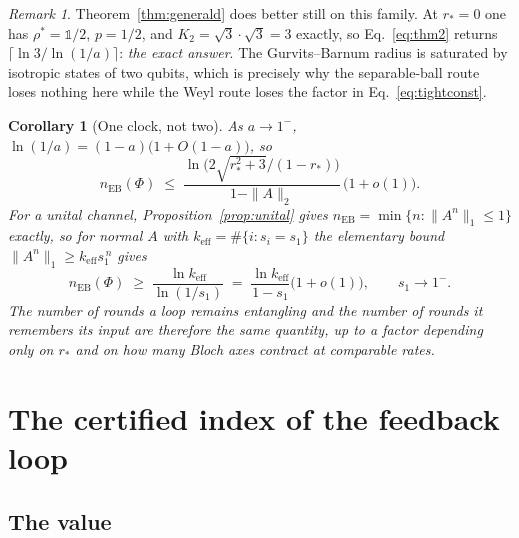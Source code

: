 \documentclass[11pt,a4paper]{article}
\newtheorem{corollary}[theorem]{Corollary}
\theoremstyle{definition}
\theoremstyle{remark}
\newtheorem{remark}[theorem]{Remark}
\newcommand{\openone}{\mathbb{1}}%
\begin{document}
\begin{remark}\label{rem:gbtight}
Theorem~\ref{thm:generald} does better still on this family. At $r_\ast=0$ one has $\rho^\ast=\openone/2$, $p=1/2$, and
$K_2=\sqrt3\cdot\sqrt3=3$ exactly, so Eq.~\eqref{eq:thm2} returns
$\lceil\ln3/\ln(1/a)\rceil$: \emph{the exact answer}. The Gurvits--Barnum
radius is saturated by isotropic states of two qubits, which is precisely why
the separable-ball route loses nothing here while the Weyl route loses the
factor in Eq.~\eqref{eq:tightconst}.
\end{remark}

\begin{corollary}[One clock, not two]\label{cor:clock}
As $a\to1^-$, $\ln(1/a)=(1-a)\bigl(1+O(1-a)\bigr)$, so
\begin{equation}
  n_{\mathrm{EB}}(\Phi)\;\le\;
  \frac{\ln\bigl(2\sqrt{r_\ast^2+3}/(1-r_\ast)\bigr)}{1-\|A\|_2}\,\bigl(1+o(1)\bigr).
\end{equation}
For a \emph{unital} channel, Proposition~\ref{prop:unital} gives
$n_{\mathrm{EB}}=\min\{n:\|A^n\|_1\le1\}$ exactly, so for normal $A$ with
$k_{\mathrm{eff}}=\#\{i:s_i=s_1\}$ the elementary bound $\|A^n\|_1\ge
k_{\mathrm{eff}}s_1^{\,n}$ gives
\begin{equation}
  n_{\mathrm{EB}}(\Phi)\;\ge\;\frac{\ln k_{\mathrm{eff}}}{\ln(1/s_1)}
  \;=\;\frac{\ln k_{\mathrm{eff}}}{1-s_1}\bigl(1+o(1)\bigr),\qquad s_1\to1^- .
\end{equation}
The number of rounds a loop remains entangling and the number of rounds it
remembers its input are therefore the same quantity, up to a factor depending
only on $r_\ast$ and on how many Bloch axes contract at comparable rates.
\end{corollary}

\section{The certified index of the feedback loop}
\label{sec:certified}



\subsection{The value}
\end{document}
